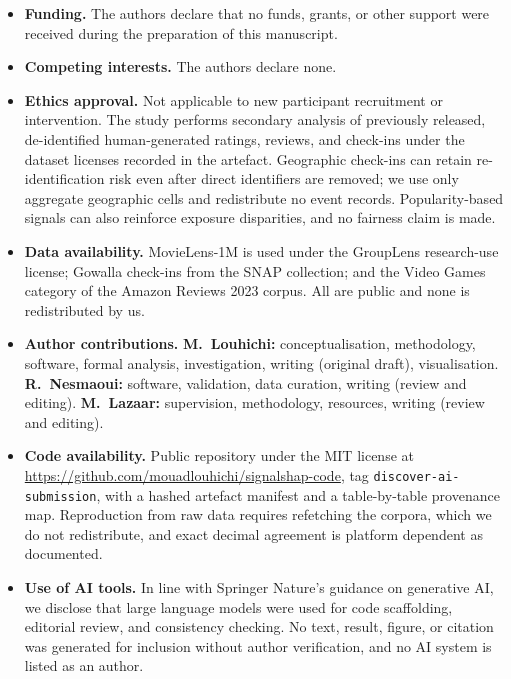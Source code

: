 \documentclass[pdflatex,sn-basic,Numbered]{sn-jnl}
\theoremstyle{plain}
\theoremstyle{definition}
\begin{document}
\begin{itemize}
\item \textbf{Funding.} The authors declare that no funds, grants, or other
      support were received during the preparation of this manuscript.
\item \textbf{Competing interests.} The authors declare none.
\item \textbf{Ethics approval.} Not applicable to new participant recruitment
      or intervention. The study performs secondary analysis of previously
      released, de-identified human-generated ratings, reviews, and check-ins
      under the dataset licenses recorded in the artefact. Geographic check-ins
      can retain re-identification risk even after direct identifiers are
      removed; we use only aggregate geographic cells and redistribute no event
      records. Popularity-based signals can also reinforce exposure disparities,
      and no fairness claim is made.
\item \textbf{Data availability.} MovieLens-1M is used under the GroupLens
      research-use license; Gowalla check-ins from the SNAP collection; and the
      Video Games category of the Amazon Reviews 2023 corpus. All are public
      and none is redistributed by us.
\item \textbf{Author contributions.} \textbf{M.\ Louhichi:} conceptualisation,
      methodology, software, formal analysis, investigation, writing (original draft), visualisation. \textbf{R.\ Nesmaoui:} software, validation, data curation, writing (review and editing). \textbf{M.\ Lazaar:}
      supervision, methodology, resources, writing (review and editing).
\item \textbf{Code availability.} Public repository under the MIT license at
      \url{https://github.com/mouadlouhichi/signalshap-code}, tag
      \texttt{discover-ai-submission}, with a hashed artefact manifest and a
      table-by-table provenance map. Reproduction from raw data requires
      refetching the corpora, which we do not redistribute, and exact decimal
      agreement is platform dependent as documented.
\item \textbf{Use of AI tools.} In line with Springer Nature's guidance on
      generative AI, we disclose that large language models were used for code
      scaffolding, editorial review, and consistency checking. No text, result,
      figure, or citation was generated for inclusion without author
      verification, and no AI system is listed as an author.
\end{itemize}


\end{document}
